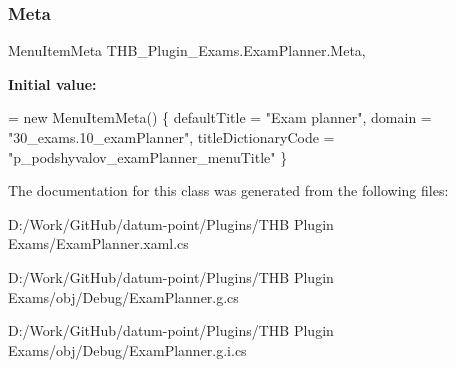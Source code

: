 \subsubsection{\texorpdfstring{Meta}{Meta}}
{\footnotesize\ttfamily Menu\+Item\+Meta T\+H\+B\+\_\+\+Plugin\+\_\+\+Exams.\+Exam\+Planner.\+Meta\hspace{0.3cm}{\ttfamily [get]}, {\ttfamily [set]}}

{\bfseries Initial value\+:}
\begin{DoxyCode}
= \textcolor{keyword}{new} MenuItemMeta()
        \{
            defaultTitle = \textcolor{stringliteral}{"Exam planner"},
            domain = \textcolor{stringliteral}{"30\_exams.10\_examPlanner"},
            titleDictionaryCode = \textcolor{stringliteral}{"p\_podshyvalov\_examPlanner\_menuTitle"}
        \}
\end{DoxyCode}


The documentation for this class was generated from the following files\+:\begin{DoxyCompactItemize}
\item 
D\+:/\+Work/\+Git\+Hub/datum-\/point/\+Plugins/\+T\+H\+B Plugin Exams/Exam\+Planner.\+xaml.\+cs\item 
D\+:/\+Work/\+Git\+Hub/datum-\/point/\+Plugins/\+T\+H\+B Plugin Exams/obj/\+Debug/Exam\+Planner.\+g.\+cs\item 
D\+:/\+Work/\+Git\+Hub/datum-\/point/\+Plugins/\+T\+H\+B Plugin Exams/obj/\+Debug/Exam\+Planner.\+g.\+i.\+cs\end{DoxyCompactItemize}
